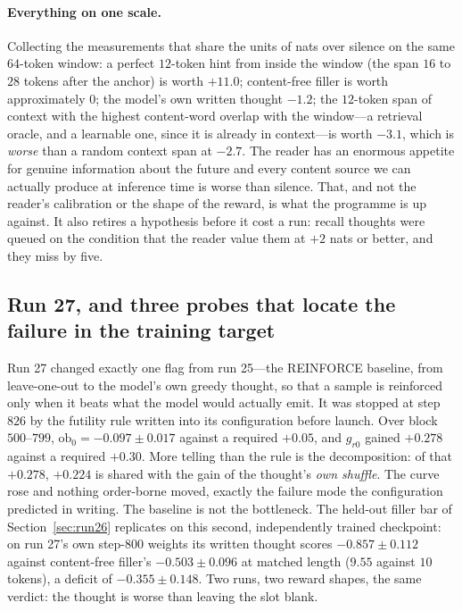 \documentclass{article} %
\begin{document}
\paragraph{Everything on one scale.} Collecting the measurements that share the units of nats over silence on the same $64$-token window: a perfect $12$-token hint from inside the window (the span $16$ to $28$ tokens after the anchor) is worth $+11.0$; content-free filler is worth approximately $0$; the model's own written thought $-1.2$; the $12$-token span of context with the highest content-word overlap with the window---a retrieval oracle, and a learnable one, since it is already in context---is worth $-3.1$, which is \emph{worse} than a random context span at $-2.7$. The reader has an enormous appetite for genuine information about the future and every content source we can actually produce at inference time is worse than silence. That, and not the reader's calibration or the shape of the reward, is what the programme is up against. It also retires a hypothesis before it cost a run: recall thoughts were queued on the condition that the reader value them at $+2$ nats or better, and they miss by five.

\subsection{Run 27, and three probes that locate the failure in the training target}
\label{sec:probes2609}

Run 27 changed exactly one flag from run 25---the REINFORCE baseline, from leave-one-out to the model's own greedy thought, so that a sample is reinforced only when it beats what the model would actually emit. It was stopped at step $826$ by the futility rule written into its configuration before launch. Over block $500$--$799$, $\mathrm{ob}_0 = -0.097 \pm 0.017$ against a required $+0.05$, and $g_{r0}$ gained $+0.278$ against a required $+0.30$. More telling than the rule is the decomposition: of that $+0.278$, $+0.224$ is shared with the gain of the thought's \emph{own shuffle}. The curve rose and nothing order-borne moved, exactly the failure mode the configuration predicted in writing. The baseline is not the bottleneck. The held-out filler bar of Section~\ref{sec:run26} replicates on this second, independently trained checkpoint: on run 27's own step-$800$ weights its written thought scores $-0.857 \pm 0.112$ against content-free filler's $-0.503 \pm 0.096$ at matched length ($9.55$ against $10$ tokens), a deficit of $-0.355 \pm 0.148$. Two runs, two reward shapes, the same verdict: the thought is worse than leaving the slot blank.
\end{document}
